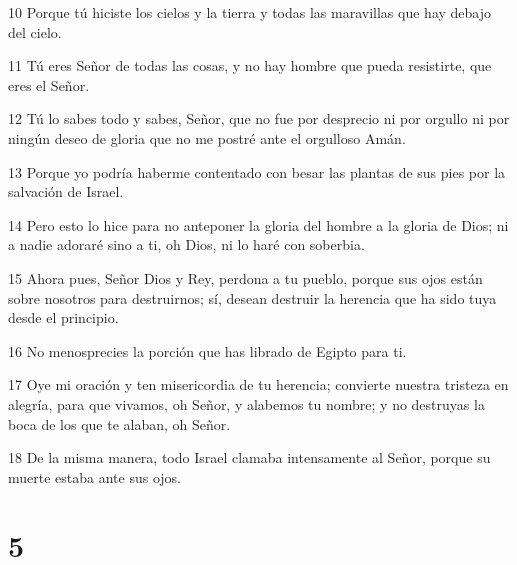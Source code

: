 \par 10 Porque tú hiciste los cielos y la tierra y todas las maravillas que hay debajo del cielo.
\par 11 Tú eres Señor de todas las cosas, y no hay hombre que pueda resistirte, que eres el Señor.
\par 12 Tú lo sabes todo y sabes, Señor, que no fue por desprecio ni por orgullo ni por ningún deseo de gloria que no me postré ante el orgulloso Amán.
\par 13 Porque yo podría haberme contentado con besar las plantas de sus pies por la salvación de Israel.
\par 14 Pero esto lo hice para no anteponer la gloria del hombre a la gloria de Dios; ni a nadie adoraré sino a ti, oh Dios, ni lo haré con soberbia.
\par 15 Ahora pues, Señor Dios y Rey, perdona a tu pueblo, porque sus ojos están sobre nosotros para destruirnos; sí, desean destruir la herencia que ha sido tuya desde el principio.
\par 16 No menosprecies la porción que has librado de Egipto para ti.
\par 17 Oye mi oración y ten misericordia de tu herencia; convierte nuestra tristeza en alegría, para que vivamos, oh Señor, y alabemos tu nombre; y no destruyas la boca de los que te alaban, oh Señor.
\par 18 De la misma manera, todo Israel clamaba intensamente al Señor, porque su muerte estaba ante sus ojos.

\chapter{5}

